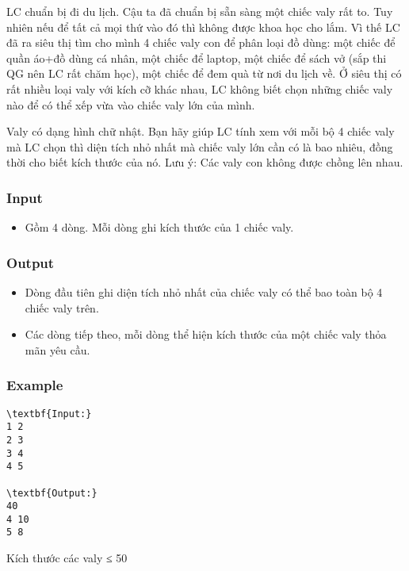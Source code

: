 

LC chuẩn bị đi du lịch. Cậu ta đã chuẩn bị sẵn sàng một chiếc valy rất to. Tuy nhiên nếu để tất cả mọi thứ vào đó thì không được khoa học cho lắm. Vì thế LC đã ra siêu thị tìm cho mình 4 chiếc valy con để phân loại đồ dùng: một chiếc để quần áo+đồ dùng cá nhân, một chiếc để laptop, một chiếc để sách vở (sắp thi QG nên LC rất chăm học), một chiếc để đem quà từ nơi du lịch về. Ở siêu thị có rất nhiều loại valy với kích cỡ khác nhau, LC không biết chọn những chiếc valy nào để có thể xếp vừa vào chiếc valy lớn của mình.

Valy có dạng hình chữ nhật. Bạn hãy giúp LC tính xem với mỗi bộ 4 chiếc valy mà LC chọn thì diện tích nhỏ nhất mà chiếc valy lớn cần có là bao nhiêu, đồng thời cho biết kích thước của nó. Lưu ý: Các valy con không được chồng lên nhau.

\subsubsection{Input}
\begin{itemize}
	\item Gồm 4 dòng. Mỗi dòng ghi kích thước của 1 chiếc valy.
\end{itemize}

\subsubsection{Output}
\begin{itemize}
	\item Dòng đầu tiên ghi diện tích nhỏ nhất của chiếc valy có thể bao toàn bộ 4 chiếc valy trên.
	\item Các dòng tiếp theo, mỗi dòng thể hiện kích thước của một chiếc valy thỏa mãn yêu cầu.
\end{itemize}

\subsubsection{Example}
\begin{verbatim}
\textbf{Input:}
1 2
2 3
3 4
4 5

\textbf{Output:}
40
4 10
5 8\end{verbatim}

Kích thước các valy ≤ 50

 
